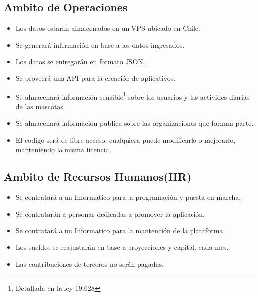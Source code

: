 \documentclass[letterpaper,openright,10pt,oneside]{report}
\begin{document}
			\subsection{Ambito de Operaciones}
			\begin{itemize}
	\item Los datos estarán almacenados en un VPS ubicado en Chile.
	\item Se generará información en base a los datos ingresados.
	\item Los datos se entregarán en formato JSON.
	\item Se proveerá una API para la creación de aplicativos.
	\item Se almacenará información sensible\footnote{Detallada en la ley 19.628} sobre los usuarios y las activides diarias de las mascotas.
	\item Se almacenará información publica sobre las organizaciones que forman parte. 
	\item El codigo será de libre acceso, cualquiera puede modificarlo o mejorarlo, manteniendo la misma licencia.
\end{itemize}
			\subsection{Ambito de Recursos Humanos(HR)}
			\begin{itemize}
	\item Se contratará a un Informatico para la programación y puesta en marcha.
	\item Se contratarán a personas dedicadas a promover la aplicación.
	\item Se contratará a un Informatico para la mantención de la plataforma
	\item Los sueldos se reajustarán en base a proyecciones y capital, cada mes.
	\item Las contribuciones de terceros no serán pagadas.
\end{itemize}
\end{document}
